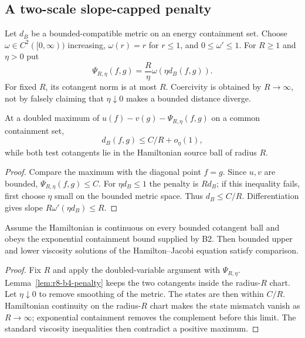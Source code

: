 \subsection{A two-scale slope-capped penalty}

Let $d_B$ be a bounded-compatible metric on an energy containment set.  Choose
$\omega\in C^2([0,\infty))$ increasing, $\omega(r)=r$ for $r\le1$, and
$0\le\omega'\le1$.  For $R\ge1$ and $\eta>0$ put
\[
 \Psi_{R,\eta}(f,g)=\frac{R}{\eta}\omega(\eta d_B(f,g)).
\]
For fixed $R$, its cotangent norm is at most $R$.  Coercivity is obtained by
$R\to\infty$, not by falsely claiming that $\eta\downarrow0$ makes a bounded
distance diverge.

\begin{lemma}
\label{lem:r8-b4-penalty}
At a doubled maximum of
$u(f)-v(g)-\Psi_{R,\eta}(f,g)$ on a common containment set,
\[
 d_B(f,g)\le C/R+o_\eta(1),
\]
while both test cotangents lie in the Hamiltonian source ball of radius $R$.
\end{lemma}

\begin{proof}
Compare the maximum with the diagonal point $f=g$.  Since $u,v$ are bounded,
$\Psi_{R,\eta}(f,g)\le C$.  For $\eta d_B\le1$ the penalty is $Rd_B$; if
this inequality fails, first choose $\eta$ small on the bounded metric space.
Thus $d_B\le C/R$.  Differentiation gives slope
$R\omega'(\eta d_B)\le R$.
\end{proof}

\begin{theorem}
\label{thm:r8-b4-comparison}
Assume the Hamiltonian is continuous on every bounded cotangent ball and obeys
the exponential containment bound supplied by B2.  Then bounded upper and
lower viscosity solutions of the Hamilton--Jacobi equation satisfy comparison.
\end{theorem}

\begin{proof}
Fix $R$ and apply the doubled-variable argument with
$\Psi_{R,\eta}$.  Lemma~\ref{lem:r8-b4-penalty} keeps the two cotangents inside
the radius-$R$ chart.  Let $\eta\downarrow0$ to remove smoothing of the metric.
The states are then within $C/R$.  Hamiltonian continuity on the radius-$R$
chart makes the state mismatch vanish as $R\to\infty$; exponential containment
removes the complement before this limit.  The standard viscosity inequalities
then contradict a positive maximum.
\end{proof}

